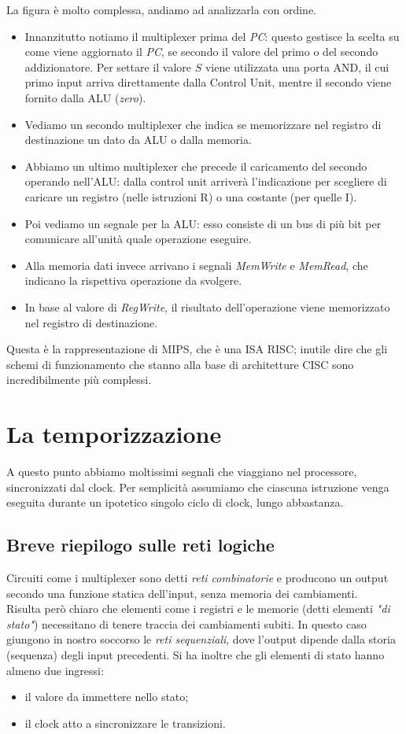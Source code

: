 La figura è molto complessa, andiamo ad analizzarla con ordine.
\begin{itemize}
	\item Innanzitutto notiamo il multiplexer prima del \emph{PC}: questo gestisce la scelta su come viene aggiornato il \emph{PC}, se secondo il valore del primo o del secondo addizionatore. Per settare il valore \(S\) viene utilizzata una porta AND, il cui primo input arriva direttamente dalla Control Unit, mentre il secondo viene fornito dalla ALU (\emph{zero}).
	\item Vediamo un secondo multiplexer che indica se memorizzare nel registro di destinazione un dato da ALU o dalla memoria.
	\item Abbiamo un  ultimo multiplexer che precede il caricamento del secondo operando nell'ALU: dalla control unit arriverà l'indicazione per scegliere di caricare un registro (nelle istruzioni R) o una costante (per quelle I).
	\item Poi vediamo un segnale per la ALU: esso consiste di un bus di più bit per comunicare all'unità quale operazione eseguire.
	\item Alla memoria dati invece arrivano i segnali \emph{MemWrite} e \emph{MemRead}, che indicano la rispettiva operazione da svolgere.
	\item In base al valore di \emph{RegWrite}, il risultato dell'operazione viene memorizzato nel registro di destinazione.
\end{itemize}
Questa è la rappresentazione di MIPS, che è una ISA RISC; inutile dire che gli schemi di funzionamento che stanno alla base di architetture CISC sono incredibilmente più complessi.

\section{La temporizzazione}
A questo punto abbiamo moltissimi segnali che viaggiano nel processore, sincronizzati dal clock. Per semplicità assumiamo che ciascuna istruzione venga eseguita durante un ipotetico singolo ciclo di clock, lungo abbastanza.

\subsection{Breve riepilogo sulle reti logiche}
Circuiti come i multiplexer sono detti \emph{reti combinatorie} e producono un output secondo una funzione statica dell'input, senza memoria dei cambiamenti.\\
Risulta però chiaro che elementi come i registri e le memorie (detti elementi \emph{"di stato"}) necessitano di tenere traccia dei cambiamenti subiti. In questo caso giungono in nostro soccorso le \emph{reti sequenziali}, dove l'output dipende dalla storia (sequenza) degli input precedenti. Si ha inoltre che gli elementi di stato hanno almeno due ingressi:
\begin{itemize}
	\item il valore da immettere nello stato;
	\item il clock atto a sincronizzare le transizioni.
\end{itemize}

